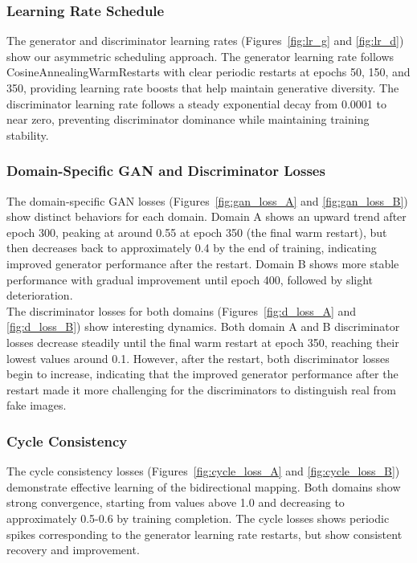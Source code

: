 \documentclass[twocolumn,superscriptaddress,aps]{revtex4-1}
\begin{document}
\subsubsection{Learning Rate Schedule}

The generator and discriminator learning rates (Figures~\ref{fig:lr_g} and \ref{fig:lr_d}) show our asymmetric scheduling approach. The generator learning rate follows CosineAnnealingWarmRestarts with clear periodic restarts at epochs 50, 150, and 350, providing learning rate boosts that help maintain generative diversity. The discriminator learning rate follows a steady exponential decay from 0.0001 to near zero, preventing discriminator dominance while maintaining training stability.

\subsubsection{Domain-Specific GAN and Discriminator Losses}

The domain-specific GAN losses (Figures~\ref{fig:gan_loss_A} and \ref{fig:gan_loss_B}) show distinct behaviors for each domain. Domain A shows an upward trend after epoch 300, peaking at around 0.55 at epoch 350 (the final warm restart), but then decreases back to approximately 0.4 by the end of training, indicating improved generator performance after the restart. Domain B shows more stable performance with gradual improvement until epoch 400, followed by slight deterioration. \\

The discriminator losses for both domains (Figures~\ref{fig:d_loss_A} and \ref{fig:d_loss_B}) show interesting dynamics. Both domain A and B discriminator losses decrease steadily until the final warm restart at epoch 350, reaching their lowest values around 0.1. However, after the restart, both discriminator losses begin to increase, indicating that the improved generator performance after the restart made it more challenging for the discriminators to distinguish real from fake images.

\subsubsection{Cycle Consistency}

The cycle consistency losses (Figures~\ref{fig:cycle_loss_A} and \ref{fig:cycle_loss_B}) demonstrate effective learning of the bidirectional mapping. Both domains show strong convergence, starting from values above 1.0 and decreasing to approximately 0.5-0.6 by training completion. The cycle losses shows periodic spikes corresponding to the generator learning rate restarts, but show consistent recovery and improvement.
\end{document}
